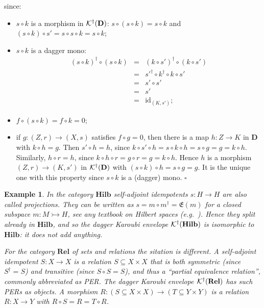 \documentclass{article}
\newtheorem{example}[theorem]{Example}
\newenvironment{proof}[1][Proof]{ \begin{trivlist}\item[\hskip \labelsep {\bfseries #1}]}{ \end{trivlist}}
\newcommand{\QEDbox}{\square}
\newcommand{\QED}{\hspace*{\fill}$\QEDbox$}
\newcommand{\after}{\mathrel{\circ}}
\newcommand{\Cat}[1]{\ensuremath{\mathbf{#1}}}
\newcommand{\idmap}[1][]{\ensuremath{\mathrm{id}_{#1}}}
\newcommand{\Rel}{\Cat{Rel}\xspace}
\newcommand{\Hilb}{\Cat{Hilb}\xspace}
\newcommand{\dagKaroubi}[1]{{\cal K}^{\dag}(#1)}
\newcommand{\effect}[1]{\mathfrak{E}(#1)}
\begin{document}
\begin{proof}
\noindent since:
\begin{itemize}
\item $s\after k$ is a morphism in $\dagKaroubi{\Cat{D}}$: $s\after (s
  \after k) = s\after k$ and $(s\after k) \after s' = s\after s\after
  k = s\after k$;

\item $s\after k$ is a dagger mono:
$$\begin{array}{rcl}
(s\after k)^{\dag} \after (s\after k)
& = &
(k \after s')^{\dag} \after (k\after s') \\
& = &
s'^{\dag} \after k^{\dag} \after k \after s' \\
& = &
s' \after s' \\
& = &
s' \\
& = &
\idmap[(K,s')];
\end{array}$$

\item $f\after (s \after k) = f\after k = 0$;

\item if $g\colon (Z,r)\rightarrow (X,s)$ satisfies $f\after g = 0$,
  then there is a map $h\colon Z\rightarrow K$ in \Cat{D} with
  $k\after h = g$.  Then $s' \after h = h$, since $k\after s' \after h
  = s \after k \after h = s \after g = g = k \after h$. Similarly, $h
  \after r = h$, since $k\after h \after r = g \after r = g = k\after
  h$. Hence $h$ is a morphism $(Z,r)\rightarrow (K,s')$ in
  $\dagKaroubi{\Cat{D}}$ with $(s\after k) \after h = s\after g =
  g$. It is the unique one with this property since $s\after k$ is a
  (dagger) mono. \QED
\end{itemize}
\end{proof}


\begin{example}
\label{KaroubiKernelEx}
In the category \Hilb self-adjoint idempotents $s\colon H\rightarrow
H$ are also called projections. They can be written as $s = m \after
m^{\dag} = \effect{m}$ for a closed subspace $m\colon M\rightarrowtail
H$, see any textbook on Hilbert spaces
(\textit{e.g.}~\cite{Dvurecenskij92}). Hence they split already in
\Hilb, and so the dagger Karoubi envelope $\dagKaroubi{\Hilb}$ is
isomorphic to \Hilb: it does not add anything.

For the category \Rel of sets and relations the sitation is different.
A self-adjoint idempotent $S\colon X\rightarrow X$ is a relation
$S\subseteq X\times X$ that is both symmetric (since $S^{\dag} = S$)
and transitive (since $S\after S = S$), and thus a ``partial
equivalence relation'', commonly abbreviated as PER. The dagger
Karoubi envelope $\dagKaroubi{\Rel}$ has such PERs as objects. A
morphism $R \colon (S\subseteq X\times X) \rightarrow (T\subseteq
Y\times Y)$ is a relation $R\colon X\rightarrow Y$ with $R\after S = R
= T\after R$.  



\end{example}
\end{document}
